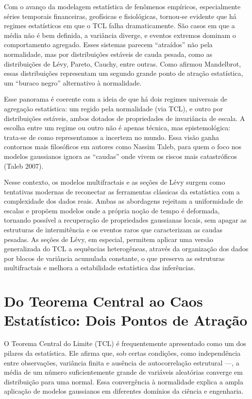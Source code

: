\documentclass[
  letterpaper,
  DIV=11,
  numbers=noendperiod]{scrartcl}
\begin{document}
Com o avanço da modelagem estatística de fenômenos empíricos,
especialmente séries temporais financeiras, geofísicas e fisiológicas,
tornou-se evidente que há regimes estatísticos em que o TCL falha
dramaticamente. São casos em que a média não é bem definida, a variância
diverge, e eventos extremos dominam o comportamento agregado. Esses
sistemas parecem ``atraídos'' não pela normalidade, mas por
distribuições estáveis de cauda pesada, como as distribuições de Lévy,
Pareto, Cauchy, entre outras. Como afirmou Mandelbrot, essas
distribuições representam um segundo grande ponto de atração
estatística, um ``buraco negro'' alternativo à normalidade.

Esse panorama é coerente com a ideia de que há dois regimes universais
de agregação estatística: um regido pela normalidade (via TCL), e outro
por distribuições estáveis, ambos dotados de propriedades de invariância
de escala. A escolha entre um regime ou outro não é apenas técnica, mas
epistemológica: trata-se de como representamos a incerteza no mundo.
Essa visão ganha contornos mais filosóficos em autores como Nassim
Taleb, para quem o foco nos modelos gaussianos ignora as ``caudas'' onde
vivem os riscos mais catastróficos (Taleb 2007).

Nesse contexto, os modelos multifractais e as seções de Lévy surgem como
tentativas modernas de reconectar as ferramentas clássicas da
estatística com a complexidade dos dados reais. Ambas as abordagens
rejeitam a uniformidade de escalas e propõem modelos onde a própria
noção de tempo é deformada, tornando possível a recuperação de
propriedades gaussianas locais, sem apagar as estruturas de
intermitência e os eventos raros que caracterizam as caudas pesadas. As
seções de Lévy, em especial, permitem aplicar uma versão generalizada do
TCL a sequências heterogêneas, através da organização dos dados por
blocos de variância acumulada constante, o que preserva as estruturas
multifractais e melhora a estabilidade estatística das inferências.

\section{Do Teorema Central ao Caos Estatístico: Dois Pontos de
Atração}\label{do-teorema-central-ao-caos-estatuxedstico-dois-pontos-de-atrauxe7uxe3o}

O Teorema Central do Limite (TCL) é frequentemente apresentado como um
dos pilares da estatística. Ele afirma que, sob certas condições, como
independência entre observações, variância finita e ausência de
autocorrelação estrutural ---, a média de um número suficientemente
grande de variáveis aleatórias converge em distribuição para uma normal.
Essa convergência à normalidade explica a ampla aplicação de modelos
gaussianos em diferentes domínios da ciência e engenharia.
\end{document}
